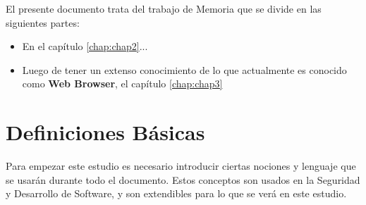 El presente documento trata del trabajo de Memoria que se divide en las siguientes partes:

\begin{itemize}
	\item En el capítulo \ref{chap:chap2}... %
	\item Luego de tener un extenso conocimiento de lo que actualmente es conocido como \textbf{Web Browser}, el capítulo \ref{chap:chap3}
\end{itemize}




\section{Definiciones Básicas}
\label{chap:Def}

Para empezar este estudio es necesario introducir ciertas nociones y lenguaje que se usarán durante todo el documento. Estos conceptos son usados en la Seguridad y Desarrollo de Software, y son extendibles para lo que se verá en este estudio.

